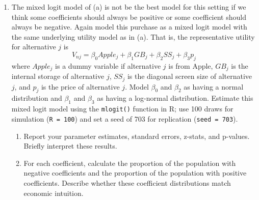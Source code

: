 \documentclass[11pt,letterpaper]{article}
\begin{document}
\begin{enumerate}[label=\alph*., leftmargin=*]
	\item The mixed logit model of (a) is not be the best model for this setting if we think some coefficients should always be positive or some coefficient should always be negative. Again model this purchase as a mixed logit model with the same underlying utility model as in (a). That is, the representative utility for alternative $j$ is
	$$V_{nj} = \beta_0 Apple_j + \beta_1 GB_j + \beta_2 SS_j + \beta_3 p_j$$
	where $Apple_j$ is a dummy variable if alternative $j$ is from Apple, $GB_j$ is the internal storage of alternative $j$, $SS_j$ is the diagonal screen size of alternative $j$, and $p_j$ is the price of alternative $j$. Model $\beta_0$ and $\beta_2$ as having a normal distribution and $\beta_1$ and $\beta_3$ as having a log-normal distribution. Estimate this mixed logit model using the \texttt{mlogit()} function in R; use 100 draws for simulation (\texttt{R = 100}) and set a seed of 703 for replication (\texttt{seed = 703}). 
	\begin{enumerate}[label=\roman*.]
		\item Report your parameter estimates, standard errors, z-stats, and p-values. Briefly interpret these results. 
		\item For each coefficient, calculate the proportion of the population with negative coefficients and the proportion of the population with positive coefficients. Describe whether these coefficient distributions match economic intuition.
	\end{enumerate}


\end{enumerate}
\end{document}
